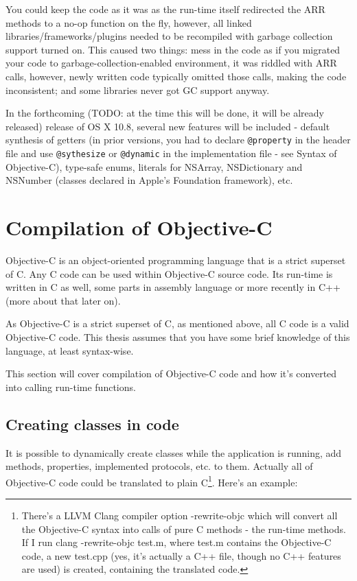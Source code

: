 \documentclass[a4paper, 11pt, fleqn]{book}
\begin{document}
You could keep the code as it was as the run-time itself redirected the ARR methods to a no-op function on the fly, however, all linked libraries/frameworks/plugins needed to be recompiled with garbage collection support turned on. This caused two things: mess in the code as if you migrated your code to garbage-collection-enabled environment, it was riddled with ARR calls, however, newly written code typically omitted those calls, making the code inconsistent; and some libraries never got GC support anyway.

In the forthcoming (TODO: at the time this will be done, it will be already released) release of OS X 10.8, several new features will be included - default synthesis of getters (in prior versions, you had to declare \verb=@property= in the header file and use \verb=@sythesize= or \verb=@dynamic= in the implementation file - see Syntax of Objective-C), type-safe enums, literals for NSArray, NSDictionary and NSNumber (classes declared in Apple's Foundation framework), etc.

\section{Compilation of Objective-C}

  Objective-C is an object-oriented programming language that is a strict superset of C. Any C code can be used within Objective-C source code. Its run-time is written in C as well, some parts in assembly language or more recently in C++ (more about that later on).

As Objective-C is a strict superset of C, as mentioned above, all C code is a valid Objective-C code. This thesis assumes that you have some brief knowledge of this language, at least syntax-wise.

This section will cover compilation of Objective-C code and how it's converted into calling run-time functions.

\subsection{Creating classes in code}

It is possible to dynamically create classes while the application is running, add methods, properties, implemented protocols, etc. to them. Actually all of Objective-C code could be translated to plain C\footnote{There's a LLVM Clang compiler option -rewrite-objc which will convert all the Objective-C syntax into calls of pure C methods - the run-time methods. If I run clang -rewrite-objc test.m, where test.m contains the Objective-C code, a new test.cpp (yes, it's actually a C++ file, though no C++ features are used) is created, containing the translated code.}. Here's an example:
\end{document}

